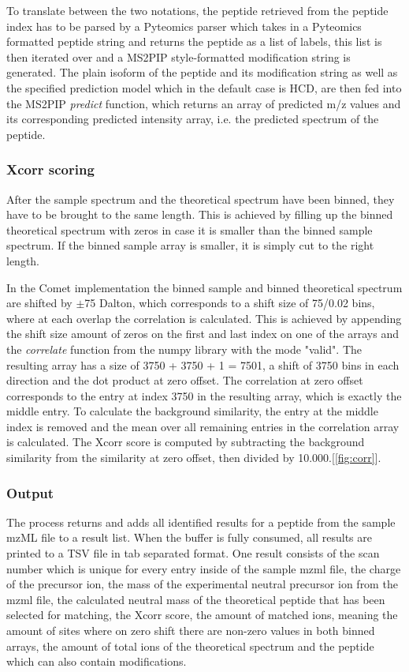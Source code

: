 \documentclass[11pt]{article}
\begin{document}
To translate between the two notations, the peptide retrieved from the peptide index has to be parsed by a Pyteomics parser which takes in a Pyteomics formatted peptide string and returns the peptide as a list of labels, this list is then iterated over and a MS2PIP style-formatted modification string is generated. The plain isoform of the peptide and its modification string as well as the specified prediction model which in the default case is HCD, are then fed into the MS2PIP \textit{predict} function, which returns an array of predicted m/z values and its corresponding predicted intensity array, i.e. the predicted spectrum of the peptide.

\subsubsection{Xcorr scoring}
After the sample spectrum and the theoretical spectrum have been binned, they have to be brought to the same length. This is achieved by filling up the binned theoretical spectrum with zeros in case it is smaller than the binned sample spectrum. If the binned sample array is smaller, it is simply cut to the right length. 

In the Comet implementation the binned sample and binned theoretical spectrum are shifted by $\pm$75 Dalton, which corresponds to a shift size of 75/0.02 bins, where at each overlap the correlation is calculated. This is achieved by appending the shift size amount of zeros on the first and last index on one of the arrays and the \textit{correlate} function from the numpy library with the mode "valid". The resulting array has a size of 3750 + 3750 + 1 = 7501, a shift of 3750 bins in each direction and the dot product at zero offset. The correlation at zero offset corresponds to the entry at index 3750 in the resulting array, which is exactly the middle entry. To calculate the background similarity, the entry at the middle index is removed and the mean over all remaining entries in the correlation array is calculated. The Xcorr score is computed by subtracting the background similarity from the similarity at zero offset, then divided by 10.000.[\cref{fig:corr}].

\subsubsection{Output}
The process returns and adds all identified results for a peptide from the sample mzML file to a result list. When the buffer is fully consumed, all results are printed to a TSV file in tab separated format. One result consists of the scan number which is unique for every entry inside of the sample mzml file, the charge of the precursor ion, the mass of the experimental neutral precursor ion from the mzml file, the calculated neutral mass of the theoretical peptide that has been selected for matching, the Xcorr score, the amount of matched ions, meaning the amount of sites where on zero shift there are non-zero values in both binned arrays, the amount of total ions of the theoretical spectrum and the peptide which can also contain modifications.
\end{document}

